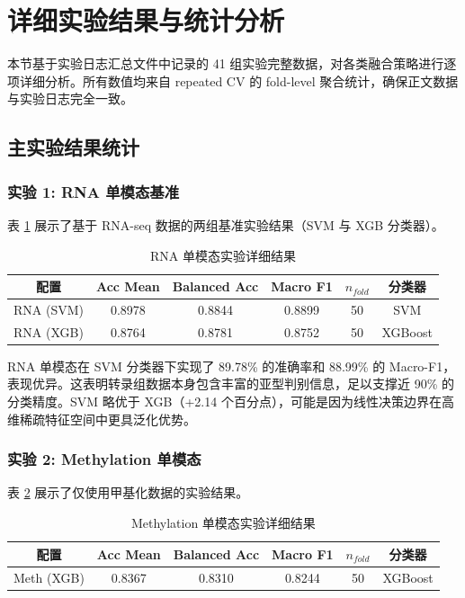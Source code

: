 \section{详细实验结果与统计分析}

本节基于实验日志汇总文件中记录的 41 组实验完整数据，对各类融合策略进行逐项详细分析。所有数值均来自 repeated CV 的 fold-level 聚合统计，确保正文数据与实验日志完全一致。

\subsection{主实验结果统计}

\subsubsection{实验 1: RNA 单模态基准}

表 \ref{tab:rna_results} 展示了基于 RNA-seq 数据的两组基准实验结果（SVM 与 XGB 分类器）。

\begin{table}[htbp]
\centering
\caption{RNA 单模态实验详细结果}
\label{tab:rna_results}
\begin{tabular}{|c|ccccc|}
\hline
\textbf{配置} & \textbf{Acc Mean} & \textbf{Balanced Acc} & \textbf{Macro F1} & $n_{fold}$ & \textbf{分类器} \\
\hline
RNA (SVM) & 0.8978 & 0.8844 & 0.8899 & 50 & SVM \\
RNA (XGB) & 0.8764 & 0.8781 & 0.8752 & 50 & XGBoost \\
\hline
\end{tabular}
\end{table}

RNA 单模态在 SVM 分类器下实现了 89.78\% 的准确率和 88.99\% 的 Macro-F1，表现优异。这表明转录组数据本身包含丰富的亚型判别信息，足以支撑近 90\% 的分类精度。SVM 略优于 XGB（+2.14 个百分点），可能是因为线性决策边界在高维稀疏特征空间中更具泛化优势。

\subsubsection{实验 2: Methylation 单模态}

表 \ref{tab:meth_results} 展示了仅使用甲基化数据的实验结果。

\begin{table}[htbp]
\centering
\caption{Methylation 单模态实验详细结果}
\label{tab:meth_results}
\begin{tabular}{|c|ccccc|}
\hline
\textbf{配置} & \textbf{Acc Mean} & \textbf{Balanced Acc} & \textbf{Macro F1} & $n_{fold}$ & \textbf{分类器} \\
\hline
Meth (XGB) & 0.8367 & 0.8310 & 0.8244 & 50 & XGBoost \\
\hline
\end{tabular}
\end{table}

